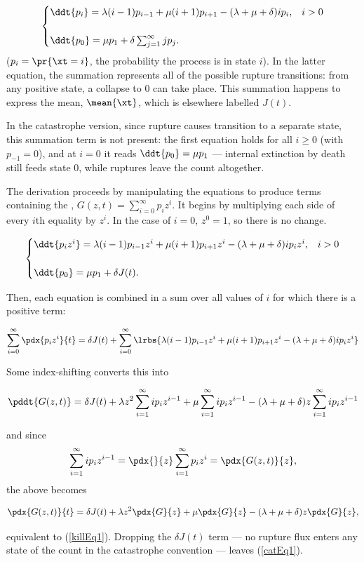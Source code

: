 $$\begin{cases}
    \ddt{p_i} = \lambda (i-1) p_{i-1} + \mu (i+1) p_{i+1} - (\lambda + \mu + \delta)ip_i, & i > 0\\
   \\
    \ddt{p_0} = \mu p_1 +  \delta\sum^\infty_{j=1} jp_j.
\end{cases}$$
($p_i = \pr{\xt = i}$, the probability the process is in state $i$). In the
latter equation, the summation represents all of the possible rupture
transitions: from any positive state, a collapse to $0$ can take place. This
summation happens to express the mean, $\mean{\xt}$, which is elsewhere
labelled $J(t)$.\par
In the catastrophe version, since rupture causes transition to a separate
state, this summation term is not present: the first equation holds for all
$i\ge0$ (with $p_{-1}=0$), and at $i=0$ it reads
$\ddt{p_0}=\mu p_1$ --- internal extinction by death still feeds state $0$,
while ruptures leave the count altogether.\par
\vspace{10pt}

\noindent
The derivation proceeds by manipulating the equations to produce terms
containing the \pgf, $G(z, t) = \sum^\infty_{i=0}p_i z^i$. It begins by
multiplying each side of every $i$th equality by $z^i$. In the case of
$i=0$, $z^0 = 1$, so there is no change.

$$\begin{cases}
    \ddt{p_iz^i} = \lambda (i-1) p_{i-1}z^i + \mu (i+1) p_{i+1}z^i - (\lambda + \mu + \delta)ip_iz^i, & i > 0\\
   \\
    \ddt{p_0} = \mu p_1 +  \delta J(t).
\end{cases}$$

\noindent
Then, each equation is combined in a sum over all values of $i$ for which
there is a positive term:

$$
\sum^\infty_{i=0} \pdx{p_iz^i}{t} = \delta J(t)   + \sum^\infty_{i=0}\lrbs{ \lambda (i-1) p_{i-1}z^i + \mu (i+1) p_{i+1}z^i - (\lambda + \mu + \delta)ip_iz^i}$$

\noindent
Some index-shifting converts this into

$$\pddt{G(z,t)} = \delta J(t) + \lambda z^2 \sum^\infty_{i=1} ip_iz^{i-1} + \mu\sum^\infty_{i=1}ip_iz^{i-1} - (\lambda +\mu+\delta)z\sum^\infty_{i=1}ip_iz^{i-1}$$

\noindent
and since
$$\sum^\infty_{i=1} ip_iz^{i-1}  = \pdx{}{z}\sum^\infty_{i=1} p_iz^{i} = \pdx{G(z,t)}{z},$$
the above becomes

$$\pdx{G(z,t)}{t} = \delta J(t) +  \lambda z^2\pdx{G}{z}  + \mu\pdx{G}{z} - (\lambda + \mu + \delta)z\pdx{G}{z},$$

\noindent
equivalent to (\ref{killEq1}). Dropping the $\delta J(t)$ term --- no
rupture flux enters any state of the count in the catastrophe convention ---
leaves (\ref{catEq1}).
